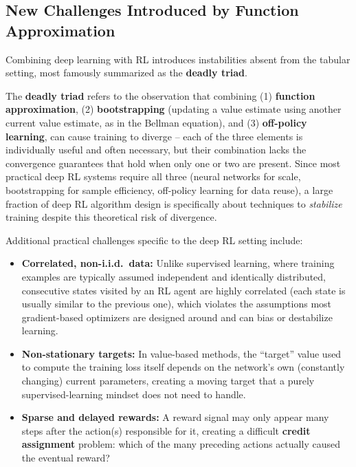 \documentclass[12pt,a4paper]{article}
\begin{document}
\subsection{New Challenges Introduced by Function Approximation}

Combining deep learning with RL introduces instabilities absent from the tabular setting, most famously summarized as the \textbf{deadly triad}.

\begin{keyidea}
The \textbf{deadly triad} refers to the observation that combining (1) \textbf{function approximation}, (2) \textbf{bootstrapping} (updating a value estimate using another current value estimate, as in the Bellman equation), and (3) \textbf{off-policy learning}, can cause training to diverge -- each of the three elements is individually useful and often necessary, but their combination lacks the convergence guarantees that hold when only one or two are present. Since most practical deep RL systems require all three (neural networks for scale, bootstrapping for sample efficiency, off-policy learning for data reuse), a large fraction of deep RL algorithm design is specifically about techniques to \emph{stabilize} training despite this theoretical risk of divergence.
\end{keyidea}

Additional practical challenges specific to the deep RL setting include:

\begin{itemize}[leftmargin=1.5em]
    \item \textbf{Correlated, non-i.i.d.\ data:} Unlike supervised learning, where training examples are typically assumed independent and identically distributed, consecutive states visited by an RL agent are highly correlated (each state is usually similar to the previous one), which violates the assumptions most gradient-based optimizers are designed around and can bias or destabilize learning.
    \item \textbf{Non-stationary targets:} In value-based methods, the ``target'' value used to compute the training loss itself depends on the network's own (constantly changing) current parameters, creating a moving target that a purely supervised-learning mindset does not need to handle.
    \item \textbf{Sparse and delayed rewards:} A reward signal may only appear many steps after the action(s) responsible for it, creating a difficult \textbf{credit assignment} problem: which of the many preceding actions actually caused the eventual reward?
\end{itemize}
\end{document}
